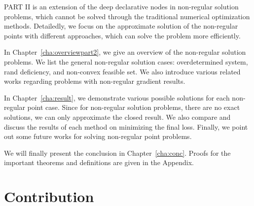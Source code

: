 \par PART II is an extension of the deep declarative nodes in non-regular solution problems, which cannot be solved through the traditional numerical optimization methods. Detailedly, we focus on the approximate solution of the non-regular points with different approaches, which can solve the problem more efficiently. 
\begin{description}
    \item In Chapter~\ref{cha:overviewpart2}, we give an overview of the non-regular solution problems. We list the general non-regular solution cases: overdetermined system, rand deficiency, and non-convex feasible set. We also introduce various related works regarding problems with non-regular gradient results. 
    \item In Chapter~\ref{cha:result}, we demonstrate various possible solutions for each non-regular point case. Since for non-regular solution problems, there are no exact solutions, we can only approximate the closed result. We also compare and discuss the results of each method on minimizing the final loss. Finally, we point out some future works for solving non-regular point problems. 
\end{description}
We will finally present the conclusion in Chapter~\ref{cha:conc}. Proofs for the important theorems and definitions are given in the Appendix.

\section{Contribution}
\label{sec.contribution}